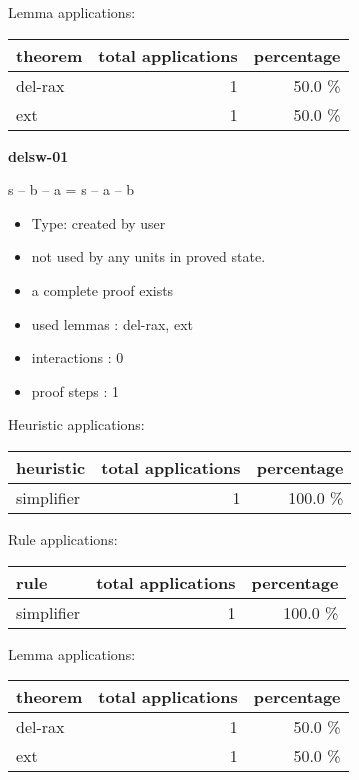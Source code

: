 \documentclass[a4paper]{article}
\begin{document}
Lemma applications:

\begin{supertabular}{l|r|r}
theorem	        & total applications & percentage \\ \hline
del-rax & 1 & 50.0 \% \\
ext & 1 & 50.0 \% \\

\end{supertabular}
\pagebreak

{\LARGE\bf delsw-01}\label{lemma-delsw-01}

\medskip

 \Fol s -- b -- a = s -- a -- b

\begin{itemize}

\item Type: created by user

\item not used by any units in proved state.
\item       a complete proof exists
\item       used lemmas  : del-rax, ext
\item       interactions : 0
\item       proof steps  : 1
\end{itemize}

\medskip


Heuristic applications:

\begin{supertabular}{l|r|r}
heuristic	& total applications & percentage \\ \hline
simplifier & 1 & 100.0 \% \\

\end{supertabular}

Rule applications:

\begin{supertabular}{l|r|r}
rule	        & total applications & percentage \\ \hline
simplifier & 1 & 100.0 \% \\

\end{supertabular}

Lemma applications:

\begin{supertabular}{l|r|r}
theorem	        & total applications & percentage \\ \hline
del-rax & 1 & 50.0 \% \\
ext & 1 & 50.0 \% \\

\end{supertabular}
\pagebreak
\end{document}

